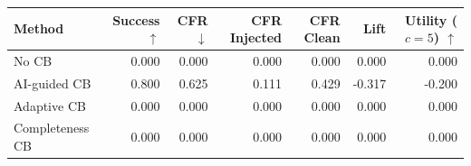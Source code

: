 \begin{tabular}{lrrrrrr}
\toprule
Method & Success $\uparrow$ & CFR $\downarrow$ & CFR Injected & CFR Clean & Lift & Utility ($c=5$) $\uparrow$ \\
\midrule
No CB & 0.000 & 0.000 & 0.000 & 0.000 & 0.000 & 0.000 \\
AI-guided CB & 0.800 & 0.625 & 0.111 & 0.429 & -0.317 & -0.200 \\
Adaptive CB & 0.000 & 0.000 & 0.000 & 0.000 & 0.000 & 0.000 \\
Completeness CB & 0.000 & 0.000 & 0.000 & 0.000 & 0.000 & 0.000 \\
\bottomrule
\end{tabular}
